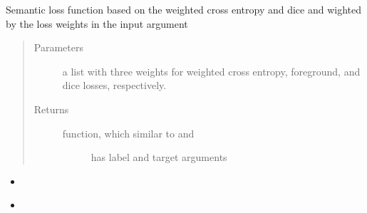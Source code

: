 \documentclass[letterpaper,10pt,english]{sphinxmanual}
\begin{document}
\begin{fulllineitems}
\label{\detokenize{index:unet.loss.multi_loss_fun}}
Semantic loss function based on the weighted cross entropy and dice and wighted by the loss weights in the input
argument
\begin{quote}\begin{description}
\item[{Parameters}] \leavevmode
{} \textendash{} a list with three weights for weighted cross entropy, foreground, and dice losses, respectively.

\item[{Returns}] \leavevmode
\begin{description}
\item[{function, which similar to  and {\hyperref[\detokenize{index:unet.loss.dice_loss}]{}}}] \leavevmode
has label and target arguments

\end{description}


\end{description}\end{quote}



\begin{itemize}
\item {} 

\item {} 
{\hyperref[\detokenize{index:unet.loss.dice_loss}]{}}

\end{itemize}



\end{fulllineitems}

\end{document}

